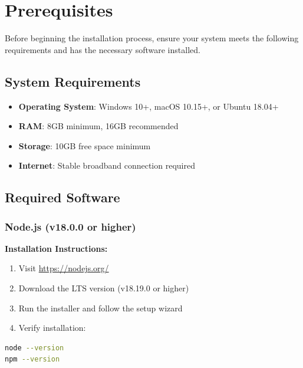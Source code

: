 \documentclass[a4paper,12pt]{article}
\begin{document}
\section{Prerequisites}

Before beginning the installation process, ensure your system meets the following requirements and has the necessary software installed.

\subsection{System Requirements}

\begin{tcolorbox}[colback=lightgray,colframe=black,title=\textbf{Minimum System Requirements}]
\begin{itemize}[leftmargin=*]
    \item \textbf{Operating System}: Windows 10+, macOS 10.15+, or Ubuntu 18.04+
    \item \textbf{RAM}: 8GB minimum, 16GB recommended
    \item \textbf{Storage}: 10GB free space minimum
    \item \textbf{Internet}: Stable broadband connection required
\end{itemize}
\end{tcolorbox}

\subsection{Required Software}

\subsubsection{Node.js (v18.0.0 or higher)}

\textbf{Installation Instructions:}

\begin{enumerate}
    \item Visit \href{https://nodejs.org/}{https://nodejs.org/}
    \item Download the LTS version (v18.19.0 or higher)
    \item Run the installer and follow the setup wizard
    \item Verify installation:
\end{enumerate}

\begin{lstlisting}[language=bash]
node --version
npm --version
\end{lstlisting}
\end{document}
